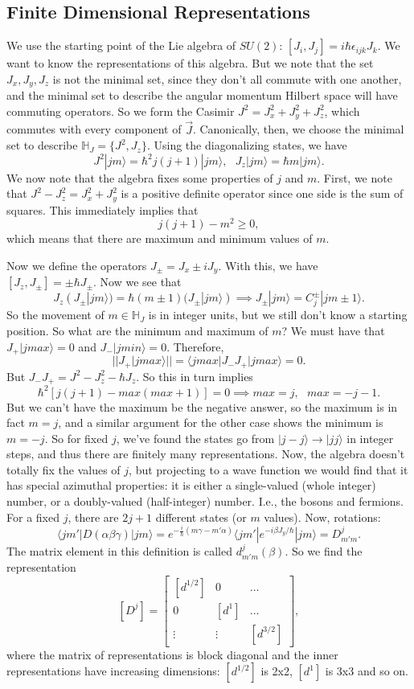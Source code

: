 \documentclass[fontsize=12pt]{scrartcl}
\newcommand{\bb}[1]{\mathbb{#1}}
\newcommand{\la}{\langle}
\newcommand{\ra}{\rangle}
\begin{document}
\subsection{Finite Dimensional Representations}
We use the starting point of the Lie algebra of $SU(2)$: $[J_i,J_j]=i\hbar\epsilon_{ijk}J_k$. We want to know the representations of this algebra. But we note that the set $J_x,J_y,J_z$ is not the minimal set, since they don't all commute with one another, and the minimal set to describe the angular momentum Hilbert space will have commuting operators. So we form the Casimir $J^2=J_x^2+J_y^2+J_z^2$, which commutes with every component of $\vec{J}$. Canonically, then, we choose the minimal set to describe $\bb{H}_J=\{J^2, J_z\}.$ Using the diagonalizing states, we have $$J^2|jm\ra = \hbar^2j(j+1)|jm\ra, \ \ \ J_z|jm\ra=\hbar m|jm\ra.$$ We now note that the algebra fixes some properties of $j$ and $m$. First, we note that $J^2-J_z^2=J_x^2+J_y^2$ is a positive definite operator since one side is the sum of squares. This immediately implies that $$j(j+1)-m^2\geq 0,$$ which means that there are maximum and minimum values of $m$.

Now we define the operators $J_\pm=J_x\pm iJ_y$. With this, we have $[J_z, J_\pm]=\pm \hbar J_\pm.$ Now we see that $$J_z(J_\pm|jm\ra)=\hbar(m\pm 1)(J_\pm|jm\ra)\implies J_\pm|jm\ra = C_j^\pm |jm\pm1\ra.$$ So the movement of $m\in\bb{H}_J$ is in integer units, but we still don't know a starting position. So what are the minimum and maximum of $m$? We must have that $J_+|jmax\ra=0$ and $J_-|jmin\ra=0$. Therefore, $$||J_+|jmax\ra||=\la jmax|J_-J_+|jmax\ra=0.$$ But $J_-J_+=J^2-J_z^2-\hbar J_z$. So this in turn implies $$\hbar^2[j(j+1)-max(max+1)]=0\implies max=j, \ \ \ max=-j-1.$$ But we can't have the maximum be the negative answer, so the maximum is in fact $m=j$, and a similar argument for the other case shows the minimum is $m=-j$. So for fixed $j$, we've found the states go from $|j-j\ra\to|jj\ra$ in integer steps, and thus there are finitely many representations. Now, the algebra doesn't totally fix the values of $j$, but projecting to a wave function we would find that it has special azimuthal properties: it is either a single-valued (whole integer) number, or a doubly-valued (half-integer) number. I.e., the bosons and fermions. For a fixed $j$, there are $2j+1$ different states (or $m$ values). Now, rotations: $$\la jm'|D(\alpha\beta\gamma)|jm\ra=e^{-\frac{i}{\hbar}(m\gamma-m'\alpha)}\la jm'|e^{-i\beta J_y/\hbar}|jm\ra=D_{m'm}^j.$$ The matrix element in this definition is called $d_{m'm}^j(\beta)$. So we find the representation $$[D^j]=\left[\begin{matrix}
[d^{1/2}] & 0 & \dots\\
0 & [d^{1}] & \dots\\
\vdots & \vdots & [d^{3/2}]
\end{matrix}\right],$$ where the matrix of representations is block diagonal and the inner representations have increasing dimensions: $[d^{1/2}]$ is 2x2, $[d^1]$ is 3x3 and so on.
\end{document}
